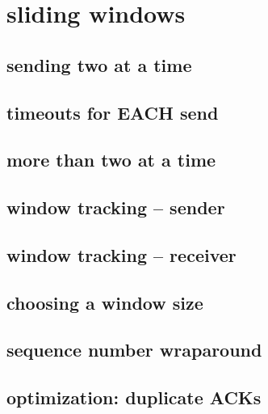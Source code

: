 \section{sliding windows}

\subsection{sending two at a time}


\subsection{timeouts for EACH send}


\subsection{more than two at a time}


\subsection{window tracking -- sender}


\subsection{window tracking -- receiver}


\subsection{choosing a window size}



\subsection{sequence number wraparound}


\subsection{optimization: duplicate ACKs}


